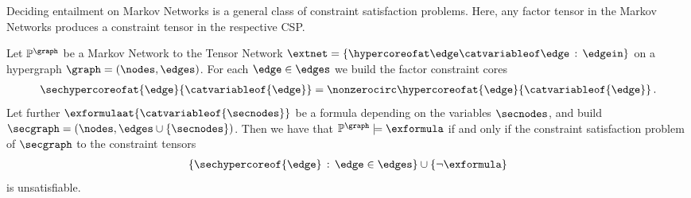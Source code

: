 
Deciding entailment on Markov Networks is a general class of constraint satisfaction problems.
Here, any factor tensor in the Markov Networks produces a constraint tensor in the respective CSP.

\begin{theorem}
    \label{the:factorReduction}
    Let $\probof{\graph}$ be a Markov Network to the Tensor Network $\extnet=\extnetasset$ on a hypergraph $\graph=(\nodes,\edges)$. %
    For each $\edge\in\edges$ we build the factor constraint cores
    \begin{align*}
        \sechypercoreofat{\edge}{\catvariableof{\edge}} = \nonzerocirc\hypercoreofat{\edge}{\catvariableof{\edge}} \, .
    \end{align*}
    Let further $\exformulaat{\catvariableof{\secnodes}}$ be a formula depending on the variables $\secnodes$, and build $\secgraph=(\nodes,\edges\cup\{\secnodes\})$.
    Then we have that $\probof{\graph}\models\exformula$ if and only if the constraint satisfaction problem of $\secgraph$ to the constraint tensors
    \begin{align*}
        \{\sechypercoreof{\edge} \wcols \edge\in\edges \} \cup \{\lnot\exformula \}
    \end{align*}
    is unsatisfiable.
\end{theorem}
